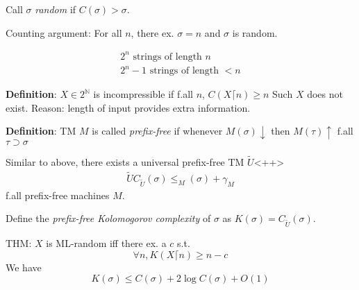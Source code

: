 \documentclass[12pt]{article}
\newcommand{\Nat}{\ensuremath{\mathbb{N}}}
\newcommand{\defn}{\textbf{Definition}: }
\begin{document}
Call $\sigma$ \emph{random} if $C(\sigma) > \sigma$.

Counting argument: For all $n$, there ex. $\sigma = n$
and $\sigma$ is random.

\begin{align*}
  2^n \text{ strings of length } n \\
  2^n - 1 \text{ strings of length } < n
\end{align*}

\defn $X \in 2^\Nat$ is incompressible if
f.all $n$, $C(X \lceil n) \ge n$
%
Such $X$ does not exist.
Reason: length of input provides extra information.


\defn TM $M$ is called \emph{prefix-free} if whenever
$M(\sigma)\downarrow$ then $M(\tau) \uparrow$ f.all $\tau \supset \sigma$

Similar to above, there exists a universal prefix-free TM $\widetilde{U}$<++>
\begin{align*}
  \widetilde{U}
  C_{\widetilde{U}}(\sigma) \le_M(\sigma) + \gamma_M
\end{align*} f.all prefix-free machines $M$.

Define the \emph{prefix-free Kolomogorov complexity} of $\sigma$
as $K(\sigma) = C_{\widetilde{U}}(\sigma)$.

THM:
$X$ is ML-random iff there ex. a $c$ s.t.
\[
\forall n, K(X\lceil n) \ge n - c
\]
We have
\[
K(\sigma) \le C(\sigma) + 2\log C(\sigma) + O(1)
\]
\end{document}
